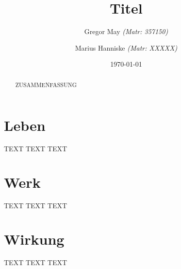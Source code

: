 \documentclass[
onecolumn,
a4paper,
abstracton,
parskip=half
,final
]{scrartcl}
\begin{document}
\titlehead{
\centering
\texttt{[image: logo\_wip.jpg]} \\
\small Technische Universit�t Berlin \\
Fakult�t VII (Wirtschaft \& Management) \\
Fachgebiet Wirtschafts- und Infrastrukturpolitik (WIP)
}
\title{Titel}
\author{
Gregor May
\footnotesize \textit{(Matr: 357150)}
\and
Marius Hanniske
\footnotesize \textit{(Matr: XXXXX)}
\and

}
\date{\today}

\maketitle


\begin{abstract}
ZUSAMMENFASSUNG
\end{abstract}

\begin{flushleft}
\end{flushleft}

\tableofcontents
\listoffigures
\listoftables

\newpage
\onehalfspacing



\section{Leben}
\label{sec1:leben}
TEXT TEXT TEXT

\clearpage
\section{Werk}
\label{sec1:werk}
TEXT TEXT TEXT

\clearpage
\section{Wirkung}
\label{sec1:wirkung}
TEXT TEXT TEXT




\vspace{10pt}
\singlespacing

\newpage


%
\end{document}
